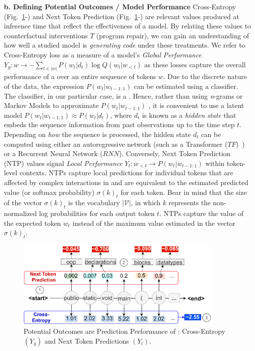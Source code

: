 \textbf{b. Defining Potential Outcomes / Model Performance} Cross-Entropy ({Fig.~\ref{fig:performance}-}) and Next Token Prediction ({Fig.~\ref{fig:performance}-}) are relevant values produced at inference time that reflect the effectiveness of a model. By relating these values to counterfactual interventions $T$ (\ie program repair), we can gain an understanding of how well a studied model is \textit{generating code} under these treatments. We refer to Cross-Entropy loss as a measure of a model's \textit{Global Performance} $Y_g: w \to - \sum_{t \in |w|} P(w_t | d_t) \log Q(w_t | w_{<t})$ as these losses capture the overall performance of a \nlm over an entire sequence of tokens $w$. Due to the discrete nature of the data, the expression $P(w_t | w_{t-1:1} )$ can be estimated using a classifier. The classifier, in our particular case, is a \nlm \citep{Bengio2003AModel}. Hence, rather than using \textit{n}-grams or Markov Models to approximate $P(w_t | w_{t-1:1})$ \citep{Karampatsis2020Open-VocabularyAbstract}, it is convenient to use a latent model $P(w_t | w_{t-1:1} ) \approx P(w_t | d_t )$, where $d_t$ is known as a \textit{hidden state} that embeds the sequence information from past observations up to the time step $t$. Depending on \textit{how} the sequence is processed, the hidden state $d_t$ can be computed using either an autoregressive network (\ie such as a Transformer ($TF$)~\citep{vaswani2017transformers}) or a Recurrent Neural Network ($RNN$). Conversely, Next Token Prediction (NTP) values signal \textit{Local Performance} $Y_l:w_{<t} \to P(w_t | w_{t-1:1})$ within token-level contexts. NTPs capture local predictions for individual tokens that are affected by complex interactions in \nlms and are equivalent to the estimated predicted value (or softmax probability) $\sigma(k)_t$ for each token. Bear in mind that the size of the vector $\sigma(k)_t$ is the vocabulary $|\mathcal{V}|$, in which $k$ represents the non-normalized log probabilities for each output token $t$. NTPs capture the value of the expected token $w_t$ instead of the maximum value estimated in the vector $\sigma(k)_t$.

\begin{figure}[h]
		\centering
		\includegraphics[width=0.9\textwidth]{graphics/preliminaries/fig_2_performance.pdf}
		\vspace{-0.3cm}
		\caption{Potential Outcomes are Prediction Performance of  \nlms: Cross-Entropy $(Y_g)$ and Next Token Predictions $(Y_l)$.}
        \vspace{-0.1cm}
        \label{fig:performance}
\end{figure}

